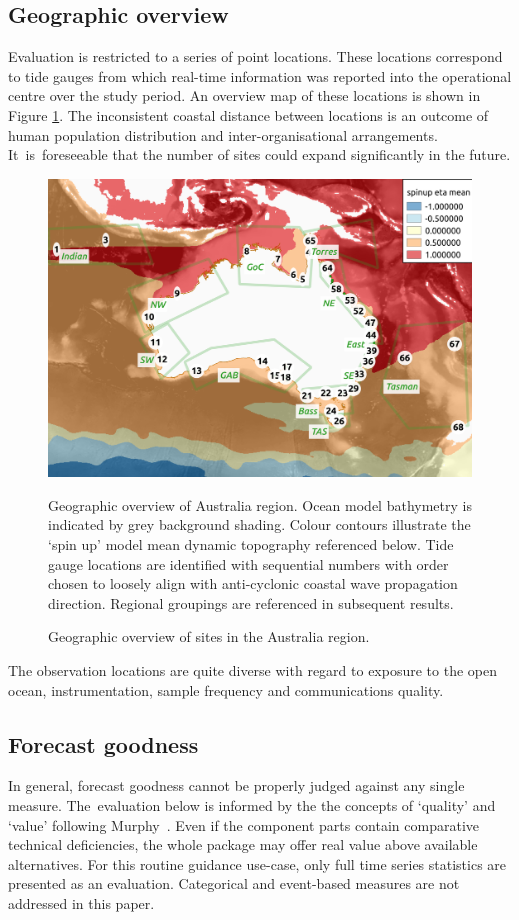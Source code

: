 \subsection{Geographic overview}
Evaluation is restricted to a series of point locations.  These locations correspond to tide gauges from which real-time information was reported into the operational centre over the study period.  An overview map of these locations is shown in Figure \ref{fig:map_locations}.
The inconsistent coastal distance between locations is an outcome of human population distribution and inter-organisational arrangements.
It~is~foreseeable that the number of sites could expand significantly in the future.
\begin{figure}[H]
    \centering
    \includegraphics[width=1.0\textwidth]{figures/maps/omaps_bathy_and_eta.png}
    \caption{Geographic overview of sites in the Australia region.}
    {Geographic overview of Australia region.  Ocean model bathymetry is indicated by grey background shading.  Colour contours illustrate the `spin up' model mean dynamic topography referenced below.  Tide gauge locations are identified with sequential numbers with order chosen to loosely align with anti-cyclonic coastal wave propagation direction. Regional groupings are referenced in subsequent results.}
    \label{fig:map_locations}
\end{figure}  

The observation locations are quite diverse with regard to exposure to the open ocean, instrumentation, sample frequency and communications quality. 


\subsection{Forecast goodness}
In general, forecast goodness cannot be properly judged against any single measure.
The~evaluation below is informed by the the concepts of `quality' and `value' following Murphy~\citep{Murphy:1993dh}.
Even if the component parts contain comparative technical deficiencies, the whole package may offer real value above available alternatives.
For this routine guidance use-case, only full time series statistics are presented as an evaluation. 
Categorical and event-based measures are not addressed in this paper.


